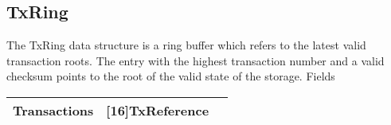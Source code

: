 \subsection{TxRing}
The TxRing data structure is a ring buffer which refers to the latest valid transaction roots. The entry with the highest transaction number and a valid checksum points to the root of the valid state of the storage.
Fields
\begin{table}[htp]
\centering
\begin{tabular}{l|l|l}
Transactions & [16]TxReference & \\ \hline
\end{tabular}
\end{table}
